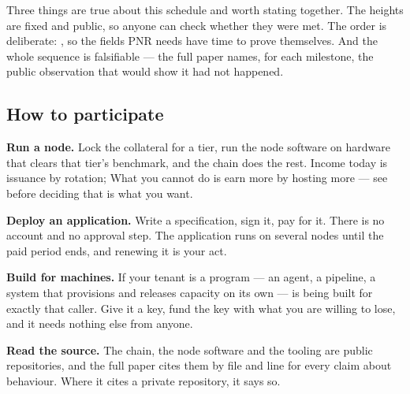 Three things are true about this schedule and worth stating together. The heights are fixed and
public, so anyone can check whether they were met. The order is deliberate: , so the fields PNR
needs have time to prove themselves. And the whole sequence is falsifiable --- the full paper names,
for each milestone, the public observation that would show it had not happened.

\subsection{How to participate}

\textbf{Run a node.} Lock the collateral for a tier, run the node software on hardware that clears
that tier's benchmark, and the chain does the rest. Income today is issuance by rotation;  What you cannot do is earn more by hosting
more --- see  before deciding that is what you want.

\textbf{Deploy an application.} Write a specification, sign it, pay for it. There is no account and
no approval step. The application runs on several nodes until the paid period ends, and renewing it
is your act. 

\textbf{Build for machines.} If your tenant is a program --- an agent, a pipeline, a system that
provisions and releases capacity on its own --- \Flux{} is being built for exactly that caller. Give
it a key, fund the key with what you are willing to lose, and it needs nothing else from anyone.

\textbf{Read the source.} The chain, the node software and the tooling are public repositories, and
the full paper cites them by file and line for every claim about behaviour. Where it cites a private
repository, it says so.
